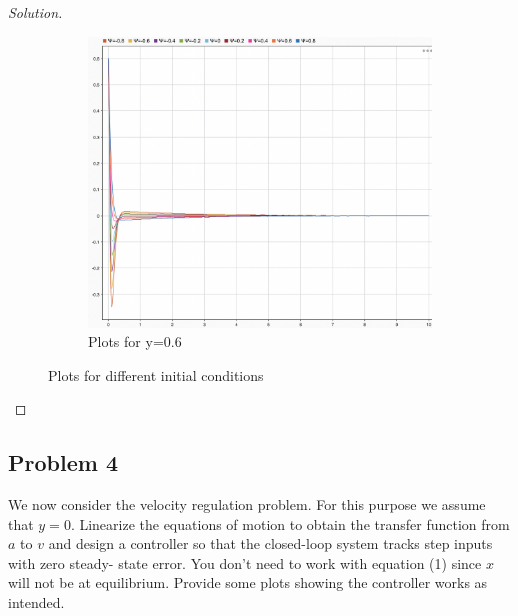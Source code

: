 \documentclass{article}
\begin{document}
\begin{proof}[Solution]
\begin{figure}
\begin{subfigure}{0.4\linewidth}
          \includegraphics[width=\linewidth]{img11.png}
          \caption{Plots for y=0.6}
        \end{subfigure}
    \caption{Plots for different initial conditions}

  \end{figure}

\end{proof}

\newpage

\subsection*{Problem 4}
We now consider the velocity regulation problem. For this purpose we assume that
$y = 0$. Linearize the equations of motion to obtain the transfer function from $a$ to $v$ and
design a controller so that the closed-loop system tracks step inputs with zero steady-
state error. You don’t need to work with equation (1) since $x$ will not be at equilibrium.
Provide some plots showing the controller works as intended.
\end{document}
